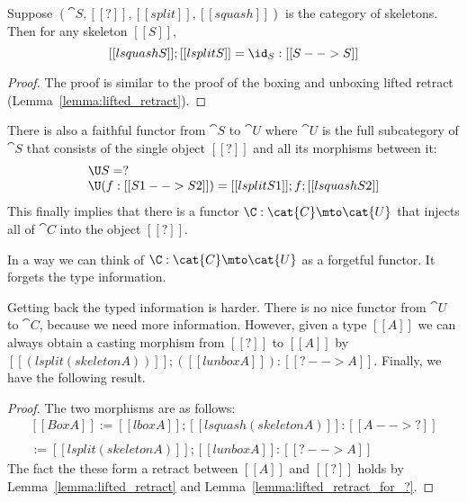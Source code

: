 \begin{lemma}
  \label{lemma:lifted_retract_for_?}
  Suppose $(\cat{S}, [[?]], [[split]],[[squash]])$ is the category of
  skeletons.  Then for any skeleton $[[S]]$,
  \[
    [[lsquash S]];[[lsplit S]] = \id_S : [[S --> S]]
  \]
\end{lemma}
\begin{proof}
  The proof is similar to the proof of the boxing and unboxing lifted
  retract (Lemma~\ref{lemma:lifted_retract}).
\end{proof}
There is also a faithful functor from $\cat{S}$ to $\cat{U}$ where
$\cat{U}$ is the full subcategory of $\cat{S}$ that consists of the
single object $[[?]]$ and all its morphisms between it:
\[
\begin{array}{lll}
  \U S = ?\\
  \U (f : [[S1 --> S2]]) = [[lsplit S1]];f;[[lsquash S2]]
\end{array}
\]
This finally implies that there is a functor $\C : \cat{C} \mto
\cat{U}$ that injects all of $\cat{C}$ into the object $[[?]]$.
\noindent
In a way we can think of $\C :  \mto {}$ as a forgetful
functor.  It forgets the type information.

Getting back the typed information is harder.  There is no nice
functor from $$ to $$, because we need more information.
However, given a type $[[A]]$ we can always obtain a casting morphism
from $[[?]]$ to $[[A]]$ by $[[(lsplit (skeleton A))]];([[lunbox A]]) :
[[? --> A]]$.  Finally, we have the following result.
\begin{proof}
  The two morphisms are as follows:
  \[
  \begin{array}{lll}
    [[Box A]] := [[lbox A]];[[lsquash (skeleton A)]] : [[A --> ?]]\\
    \\
    [[Unbox A]] := [[lsplit (skeleton A)]];[[lunbox A]] : [[? --> A]]
  \end{array}
  \]
  The fact the these form a retract between $[[A]]$ and $[[?]]$ holds
  by Lemma~\ref{lemma:lifted_retract} and
  Lemma~\ref{lemma:lifted_retract_for_?}.
\end{proof}

